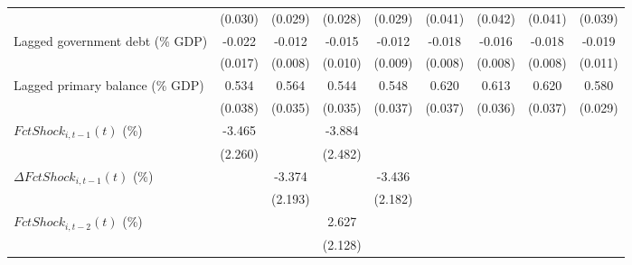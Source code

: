 {\begin{tabular}{l*{8}{c}}
                    &     (0.030)         &     (0.029)         &     (0.028)         &     (0.029)         &     (0.041)         &     (0.042)         &     (0.041)         &     (0.039)         \\
\addlinespace
Lagged government debt (\% GDP)&      -0.022         &      -0.012         &      -0.015         &      -0.012         &      -0.018\sym{*}  &      -0.016\sym{*}  &      -0.018\sym{*}  &      -0.019         \\
                    &     (0.017)         &     (0.008)         &     (0.010)         &     (0.009)         &     (0.008)         &     (0.008)         &     (0.008)         &     (0.011)         \\
\addlinespace
Lagged primary balance (\% GDP)&       0.534\sym{***}&       0.564\sym{***}&       0.544\sym{***}&       0.548\sym{***}&       0.620\sym{***}&       0.613\sym{***}&       0.620\sym{***}&       0.580\sym{***}\\
                    &     (0.038)         &     (0.035)         &     (0.035)         &     (0.037)         &     (0.037)         &     (0.036)         &     (0.037)         &     (0.029)         \\
\addlinespace
$ FctShock_{i,t-1}(t)$ (\%)&      -3.465         &                     &      -3.884         &                     &                     &                     &                     &                     \\
                    &     (2.260)         &                     &     (2.482)         &                     &                     &                     &                     &                     \\
\addlinespace
$ \Delta FctShock_{i,t-1}(t)$ (\%)&                     &      -3.374         &                     &      -3.436         &                     &                     &                     &                     \\
                    &                     &     (2.193)         &                     &     (2.182)         &                     &                     &                     &                     \\
\addlinespace
$ FctShock_{i,t-2}(t)$ (\%)&                     &                     &       2.627         &                     &                     &                     &                     &                     \\
                    &                     &                     &     (2.128)         &                     &                     &                     &                     &                     \\

\end{tabular}}
